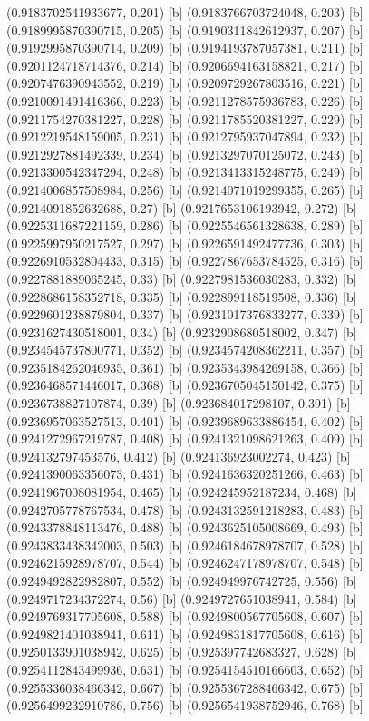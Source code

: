 {{{(0.9183702541933677, 0.201) [b] 
(0.9183766703724048, 0.203) [b] 
(0.9189995870390715, 0.205) [b] 
(0.9190311842612937, 0.207) [b] 
(0.9192995870390714, 0.209) [b] 
(0.9194193787057381, 0.211) [b] 
(0.9201124718714376, 0.214) [b] 
(0.9206694163158821, 0.217) [b] 
(0.9207476390943552, 0.219) [b] 
(0.9209729267803516, 0.221) [b] 
(0.9210091491416366, 0.223) [b] 
(0.9211278575936783, 0.226) [b] 
(0.9211754270381227, 0.228) [b] 
(0.9211785520381227, 0.229) [b] 
(0.9212219548159005, 0.231) [b] 
(0.9212795937047894, 0.232) [b] 
(0.9212927881492339, 0.234) [b] 
(0.9213297070125072, 0.243) [b] 
(0.9213300542347294, 0.248) [b] 
(0.9213413315248775, 0.249) [b] 
(0.9214006857508984, 0.256) [b] 
(0.9214071019299355, 0.265) [b] 
(0.9214091852632688, 0.27) [b] 
(0.9217653106193942, 0.272) [b] 
(0.9225311687221159, 0.286) [b] 
(0.9225546561328638, 0.289) [b] 
(0.9225997950217527, 0.297) [b] 
(0.9226591492477736, 0.303) [b] 
(0.9226910532804433, 0.315) [b] 
(0.9227867653784525, 0.316) [b] 
(0.9227881889065245, 0.33) [b] 
(0.9227981536030283, 0.332) [b] 
(0.9228686158352718, 0.335) [b] 
(0.922899118519508, 0.336) [b] 
(0.9229601238879804, 0.337) [b] 
(0.9231017376833277, 0.339) [b] 
(0.9231627430518001, 0.34) [b] 
(0.9232908680518002, 0.347) [b] 
(0.9234545737800771, 0.352) [b] 
(0.9234574208362211, 0.357) [b] 
(0.9235184262046935, 0.361) [b] 
(0.9235343984269158, 0.366) [b] 
(0.9236468571446017, 0.368) [b] 
(0.9236705045150142, 0.375) [b] 
(0.9236738827107874, 0.39) [b] 
(0.923684017298107, 0.391) [b] 
(0.9236957063527513, 0.401) [b] 
(0.9239689633886454, 0.402) [b] 
(0.9241272967219787, 0.408) [b] 
(0.9241321098621263, 0.409) [b] 
(0.924132797453576, 0.412) [b] 
(0.924136923002274, 0.423) [b] 
(0.9241390063356073, 0.431) [b] 
(0.9241636320251266, 0.463) [b] 
(0.9241967008081954, 0.465) [b] 
(0.924245952187234, 0.468) [b] 
(0.9242705778767534, 0.478) [b] 
(0.9243132591218283, 0.483) [b] 
(0.9243378848113476, 0.488) [b] 
(0.9243625105008669, 0.493) [b] 
(0.9243833438342003, 0.503) [b] 
(0.9246184678978707, 0.528) [b] 
(0.9246215928978707, 0.544) [b] 
(0.9246247178978707, 0.548) [b] 
(0.9249492822982807, 0.552) [b] 
(0.924949976742725, 0.556) [b] 
(0.9249717234372274, 0.56) [b] 
(0.9249727651038941, 0.584) [b] 
(0.9249769317705608, 0.588) [b] 
(0.9249800567705608, 0.607) [b] 
(0.9249821401038941, 0.611) [b] 
(0.9249831817705608, 0.616) [b] 
(0.9250133901038942, 0.625) [b] 
(0.925397742683327, 0.628) [b] 
(0.9254112843499936, 0.631) [b] 
(0.9254154510166603, 0.652) [b] 
(0.9255336038466342, 0.667) [b] 
(0.9255367288466342, 0.675) [b] 
(0.9256499232910786, 0.756) [b] 
(0.9256541938752946, 0.768) [b] 
}}}
